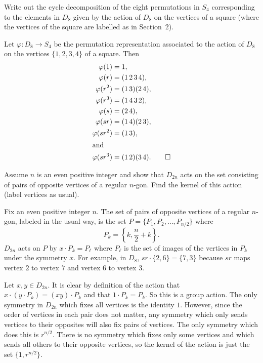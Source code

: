  Write out the cycle decomposition of the eight
permutations in $S_4$ corresponding to the elements in $D_8$ given by
the action of $D_8$ on the vertices of a square (where the vertices of
the square are labelled as in Section~2).
\begin{solution}
  Let $\varphi\colon D_8\to S_4$ be the permutation representation
  associated to the action of $D_8$ on the vertices $\{1,2,3,4\}$ of a
  square. Then
  \begin{align*}
    \varphi(1) &= 1, \\
    \varphi(r) &= (1\,2\,3\,4), \\
    \varphi(r^2) &= (1\,3)(2\,4), \\
    \varphi(r^3) &= (1\,4\,3\,2), \\
    \varphi(s) &= (2\,4), \\
    \varphi(sr) &= (1\,4)(2\,3), \\
    \varphi(sr^2) &= (1\,3), \\
    \intertext{and}
    \varphi(sr^3) &= (1\,2)(3\,4). \qedhere
  \end{align*}
\end{solution}

 Assume $n$ is an even positive integer and show that
$D_{2n}$ acts on the set consisting of pairs of opposite vertices of a
regular $n$-gon. Find the kernel of this action (label vertices as
usual).
\begin{solution}
  Fix an even positive integer $n$. The set of pairs of opposite
  vertices of a regular $n$-gon, labeled in the usual way, is the set
  $P = \{P_1,P_2,\dots,P_{n/2}\}$ where
  \begin{equation*}
    P_k = \left\{k, \frac{n}2 + k\right\}.
  \end{equation*}
  $D_{2n}$ acts on $P$ by $x\cdot P_k = P_\ell$ where $P_\ell$ is the
  set of images of the vertices in $P_k$ under the symmetry $x$. For
  example, in $D_8$, $sr\cdot\{2,6\} = \{7,3\}$ because $sr$ maps
  vertex $2$ to vertex $7$ and vertex $6$ to vertex $3$.

  Let $x,y\in D_{2n}$. It is clear by definition of the action that
  $x\cdot(y\cdot P_k) = (xy)\cdot P_k$ and that $1\cdot P_k = P_k$. So
  this is a group action. The only symmetry in $D_{2n}$ which fixes
  all vertices is the identity $1$. However, since the order of
  vertices in each pair does not matter, any symmetry which only sends
  vertices to their opposites will also fix pairs of vertices. The
  only symmetry which does this is $r^{n/2}$. There is no symmetry
  which fixes only some vertices and which sends all others to their
  opposite vertices, so the kernel of the action is just the set
  $\{1, r^{n/2}\}$.
\end{solution}

